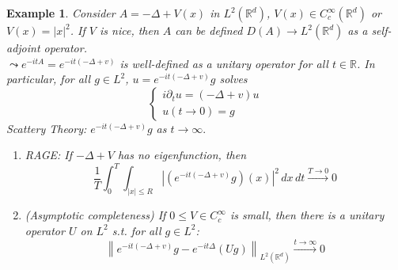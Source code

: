 \documentclass{report}
\theoremstyle{tommy}
\newtheorem{eg}[defn]{Example}
\begin{document}
  \begin{eg}
    Consider \(A = - \Delta + V(x)\) in \(L^2(\mathbb{R}^d)\), \(V(x) \in C_c^\infty(\mathbb{R}^d)\) or \(V(x) = |x|^2\). If \(V\) is nice, then \(A\) can be defined \(D(A) \to L^2(\mathbb{R}^d)\) as a self-adjoint operator. \\
    \(\leadsto e^{-itA} = e^{-it(-\Delta + v)}\) is well-defined as a unitary operator for all \(t \in \mathbb{R}\). In particular, for all \(g \in L^2\), \(u = e^{-it(-\Delta + v)} g\) solves 
    \[\begin{cases}
      i \partial_t u = (-\Delta + v) u \\ u(t \to 0) = g
    \end{cases}\]
    Scattery Theory: \(e^{-it(- \Delta + v)} g \) as \(t \to \infty.\)
    \begin{enumerate}
      \item RAGE: If \(-\Delta + V\) has no eigenfunction, then 
      \[\frac{1}{T} \int_0^T \int_{|x| \le R} \left| \left(e^{-it(-\Delta +v)}g\right)(x)\right|^2 \, dx \, dt \xrightarrow{T \to 0} 0\]
      \item (Asymptotic completeness) If \(0 \le V \in C_c^\infty\) is small, then there is a unitary operator \(U\) on \(L^2\) s.t. for all \(g \in L^2\):
      \[\left\|e^{-it(-\Delta + v)}g - e^{-it \Delta} (Ug) \right\|_{L^2(\mathbb{R}^d)} \xrightarrow{t \to \infty} 0 \]
    \end{enumerate}
  \end{eg}

  
\end{document}
